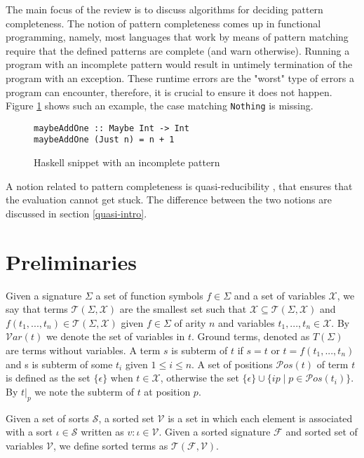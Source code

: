 The main focus of the review is to discuss algorithms for deciding pattern completeness. The notion of pattern completeness comes up in functional programming, namely, most languages that work by means of pattern matching require that the defined patterns are complete (and warn otherwise). Running a program with an incomplete pattern would result in untimely termination of the program with an exception. These runtime errors are the "worst" type of errors a program can encounter, therefore, it is crucial to ensure it does not happen. Figure \ref{fig:haskell-incomplete} shows such an example, the case matching \texttt{Nothing} is missing.

\begin{figure}[!ht]
\centering
\begin{verbatim}
maybeAddOne :: Maybe Int -> Int
maybeAddOne (Just n) = n + 1
\end{verbatim}
    \caption{Haskell snippet with an incomplete pattern}
    \label{fig:haskell-incomplete}
\end{figure}

A notion related to pattern completeness is quasi-reducibility \cite{kapur}, that ensures that the evaluation cannot get stuck. The difference between the two notions are discussed in section \ref{quasi-intro}.

\section{Preliminaries}
Given a signature $\Sigma$ a set of function symbols $f \in \Sigma$ and a set of variables $\mathcal{X}$, we say that terms $\mathcal{T}(\Sigma, \mathcal{X})$ are the smallest set such that $\mathcal{X} \subseteq \mathcal{T}(\Sigma, \mathcal{X})$ and $f(t_1, ..., t_n) \in \mathcal{T}(\Sigma, \mathcal{X})$ given $f \in \Sigma$ of arity $n$ and variables $t_1, ..., t_n \in \mathcal{X}$. By $\mathcal{V}ar(t)$ we denote the set of variables in $t$. Ground terms, denoted as $T(\Sigma)$ are terms without variables. A term $s$ is subterm of $t$ if $s = t$ or $t = f(t_1, ..., t_n)$ and s is subterm of some $t_i$ given $1 \leq i \leq n$. A set of positions $\mathcal{P}os(t)$ of term $t$ is defined as the set $\{\epsilon\}$ when $t \in \mathcal{X}$, otherwise the set $\{\epsilon\} \cup \{ip \mid p \in \mathcal{P}os(t_i)\}$. By $t|_p$ we note the subterm of $t$ at position $p$.

Given a set of sorts $\mathcal{S}$, a sorted set $\mathcal{V}$ is a set in which each element is associated with a sort $\iota \in \mathcal{S}$ written as $v : \iota \in \mathcal{V}$. Given a sorted signature $\mathcal{F}$ and sorted set of variables $\mathcal{V}$, we define sorted terms as $\mathcal{T}(\mathcal{F}, \mathcal{V})$. 

